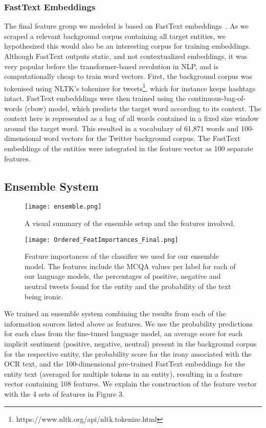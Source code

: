 \documentclass[11pt]{article}
\begin{document}
\subsubsection{FastText Embeddings}

The final feature group we modeled is based on FastText embeddings~\cite{Bojanowski2017}. As we scraped a relevant background corpus containing all target entities, we hypothesized this would also be an interesting corpus for training embeddings.
Although FastText outputs static, and not contextualized embeddings, it was very popular before the transformer-based revolution in NLP, and is computationally cheap to train word vectors. 
First, the background corpus was tokenised using NLTK's tokenizer for tweets\footnote{https://www.nltk.org/api/nltk.tokenize.html}, which for instance keeps hashtags intact.
FastText embedddings were then trained using the continuous-bag-of-words (cbow) model, which predicts the target word according to its context. The context here is represented as a bag of all words contained in a fixed size window around the target word. This resulted in a vocabulary of 61,871 words and 100-dimensional word vectors for the Twitter background corpus.
The FastText embeddings of the entities were integrated in the feature vector as 100 separate features.

\subsection{Ensemble System}

\begin{figure*}[h!]
    \centering
    \texttt{[image: ensemble.png]}
    \caption{A visual summary of the ensemble setup and the features involved.}
    \label{fig1}
\end{figure*}

\begin{figure*}[h]
    
    \texttt{[image: Ordered\_FeatImportances\_Final.png]}
    \caption{Feature importances of the classifier we used for our ensemble model. The features include the MCQA values per label for each of our language models, the percentages of positive, negative and neutral tweets found for the entity and the probability of the text being ironic.}
    \label{featimportances_figure}
\end{figure*}
We trained an ensemble system combining the results from each of the information sources listed above as features. We use the probability predictions for each class from the fine-tuned language model, an average score for each implicit sentiment (positive, negative, neutral) present in the background corpus for the respective entity, the probability score for the irony associated with the  OCR text, and the 100-dimensional pre-trained FastText embeddings for the entity text (averaged for multiple tokens in an entity), resulting in a feature vector containing 108 features. We explain the construction of the feature vector with the 4 sets of features in Figure 3. 
\end{document}
